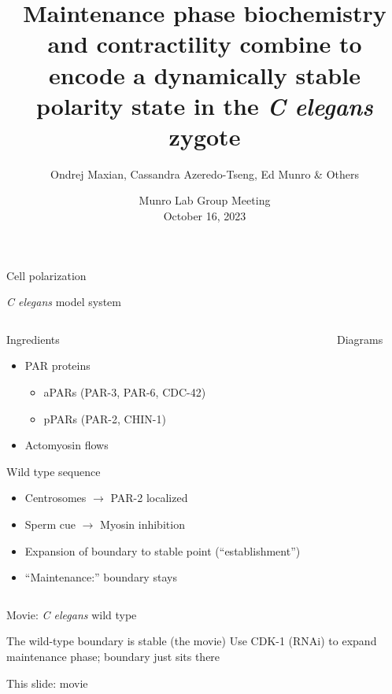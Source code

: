 \documentclass{beamer}
\title[Cell polarity dynamical system]{Maintenance phase biochemistry and contractility combine to encode a dynamically stable polarity state in the \emph{C elegans} zygote \vspace{-0.5 cm}}
\author[Ondrej Maxian, Cassandra Azeredo-Tseng, Ed Munro \& Others]{Ondrej Maxian, Cassandra Azeredo-Tseng, Ed Munro \& Others \vspace{-0.5 cm}}
\date{Munro Lab Group Meeting \\ October 16, 2023}
\newcommand{\6}[1]{#1_{\text{6}}}
\newcommand{\3}[1]{#1_{\text{3}}}
\begin{document}

\begin{frame}
  \titlepage
\vspace{-0.5 cm}
\centering
\end{frame}

\begin{frame}{Cell polarization}
\end{frame}

\begin{frame}{\emph{C elegans} model system}
\begin{columns}[t]
\begin{column}{0.6\textwidth}
Ingredients
\begin{itemize}
\item PAR proteins 
\begin{itemize}
\item aPARs (PAR-3, PAR-6, CDC-42)
\item pPARs (PAR-2, CHIN-1)
\end{itemize}
\item Actomyosin flows 
\end{itemize}
Wild type sequence
\begin{itemize}
\item Centrosomes $\rightarrow$ PAR-2 localized
\item Sperm cue $\rightarrow$ Myosin inhibition
\item Expansion of boundary to stable point (``establishment'')
\item ``Maintenance:'' boundary stays
\end{itemize}

\end{column}
\begin{column}{0.5\textwidth}
Diagrams
\end{column}
\end{columns}
\end{frame}

\begin{frame}{Movie: \emph{C elegans} wild type}
\end{frame}

\begin{frame}{The wild-type boundary is stable (the movie)}
Use CDK-1 (RNAi) to expand maintenance phase; boundary just sits there

This slide: movie

\end{frame}
\end{document}
